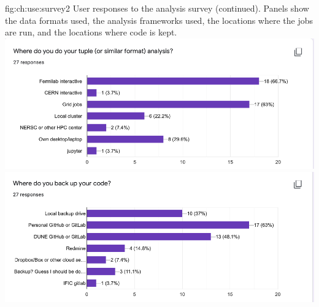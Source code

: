 \documentclass[../main-v1.tex]{subfiles}
\begin{document}
\begin{dunefigure}
{fig:ch:use:survey2}
 {User responses to the analysis survey (continued). Panels show the data formats used, the analysis frameworks used, the locations where the jobs are run, and the locations where code is kept.}
\includegraphics[width=6 in]{graphics/Algo/SurveySite.png}
\includegraphics[width=6 in]{graphics/Algo/SurveyRepo.png}
\end{dunefigure}
\end{document}
